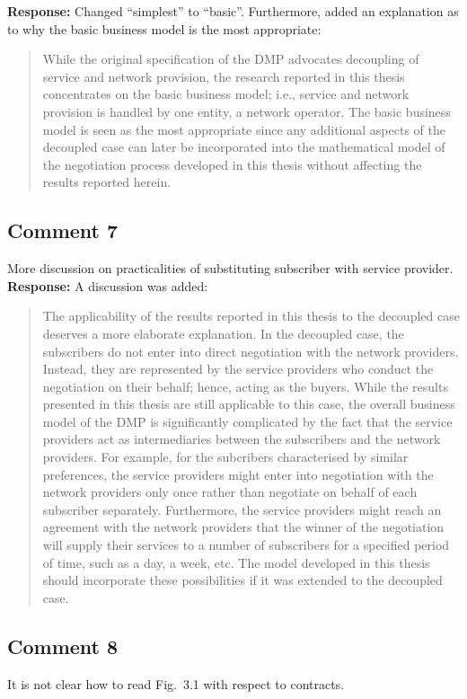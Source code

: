 \documentclass[10pt,a4paper,notitlepage]{article}
\numberwithin{equation}{section}
\begin{document}
\textbf{Response:}
Changed ``simplest'' to ``basic''. Furthermore, added an explanation as to why the basic business model is the most appropriate:
\begin{quote}
While the original specification of the DMP advocates decoupling of service and network provision, the research reported in this thesis concentrates on the basic business model; i.e., service and network provision is handled by one entity, a network operator. The basic business model is seen as the most appropriate since any additional aspects of the decoupled case can later be incorporated into the mathematical model of the negotiation process developed in this thesis without affecting the results reported herein.
\end{quote}

\subsection{Comment 7}
More discussion on practicalities of substituting subscriber with service provider.\\[-2ex]

\textbf{Response:}
A discussion was added:
\begin{quote}
The applicability of the results reported in this thesis to the decoupled case deserves a more elaborate explanation. In the decoupled case, the subscribers do not enter into direct negotiation with the network providers. Instead, they are represented by the service providers who conduct the negotiation on their behalf; hence, acting as the buyers. While the results presented in this thesis are still applicable to this case, the overall business model of the DMP is significantly complicated by the fact that the service providers act as intermediaries between the subscribers and the network providers. For example, for the subcribers characterised by similar preferences, the service providers might enter into negotiation with the network providers only once rather than negotiate on behalf of each subscriber separately. Furthermore, the service providers might reach an agreement with the network providers that the winner of the negotiation will supply their services to a number of subscribers for a specified period of time, such as a day, a week, etc. The model developed in this thesis should incorporate these possibilities if it was extended to the decoupled case.
\end{quote}

\subsection{Comment 8}
It is not clear how to read Fig.~3.1 with respect to contracts.\\[-2ex]
\end{document}
